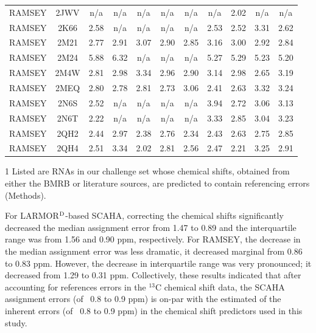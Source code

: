 \documentclass[journal=jcisd8,manuscript=article,layout=onecolumn]{achemso}
\begin{document}
\begin{table}[h!]
\begin{threeparttable}
\begin{tabular}{c c c c c c c c c c c}
RAMSEY  & 2JWV & n/a & n/a & n/a & n/a & n/a & n/a & 2.02 & n/a & n/a \\
RAMSEY  & 2K66 & 2.58 & n/a & n/a & n/a & n/a & 2.53 & 2.52 & 3.31 & 2.62 \\
RAMSEY  & 2M21 & 2.77 & 2.91 & 3.07 & 2.90 & 2.85 & 3.16 & 3.00 & 2.92 & 2.84 \\
RAMSEY  & 2M24 & 5.88 & 6.32 & n/a & n/a & n/a & 5.27 & 5.29 & 5.23 & 5.20 \\
RAMSEY  & 2M4W & 2.81 & 2.98 & 3.34 & 2.96 & 2.90 & 3.14 & 2.98 & 2.65 & 3.19 \\
RAMSEY  & 2MEQ & 2.80 & 2.78 & 2.81 & 2.73 & 3.06 & 2.41 & 2.63 & 3.32 & 3.24 \\
RAMSEY  & 2N6S & 2.52 & n/a & n/a & n/a & n/a & 3.94 & 2.72 & 3.06 & 3.13 \\
RAMSEY  & 2N6T & 2.22 & n/a & n/a & n/a & n/a & 3.33 & 2.85 & 3.04 & 3.23 \\
RAMSEY  & 2QH2 & 2.44 & 2.97 & 2.38 & 2.76 & 2.34 & 2.43 & 2.63 & 2.75 & 2.85 \\
RAMSEY  & 2QH4 & 2.51 & 3.34 & 2.02 & 2.81 & 2.56 & 2.47 & 2.21 & 3.25 & 2.91 \\

\hline
\end{tabular}
\begin{tablenotes}
\item[1] Listed are RNAs in our challenge set whose chemical shifts, obtained from either the BMRB or literature sources, are predicted to contain referencing errors (Methods).
\end{tablenotes}
\end{threeparttable}
\label{tab:referrors} 
\end{table}

For LARMOR$^{\rm D}$-based SCAHA, correcting the chemical shifts significantly decreased the median assignment error from 1.47 to 0.89 and  the interquartile range was from 1.56 and 0.90 ppm, respectively. For RAMSEY, the decrease in the median assignment error was less dramatic, it decreased marginal from 0.86 to 0.83 ppm. However, the decrease in interquartile range was very pronounced; it decreased from 1.29 to 0.31 ppm. Collectively, these results indicated that after accounting for references  errors in the $^{13}$C chemical shift data, the SCAHA assignment errors (of ~0.8 to 0.9 ppm) is on-par with the estimated of the inherent errors (of ~0.8 to 0.9 ppm) in the chemical shift predictors  used in this study.  
\end{document}
